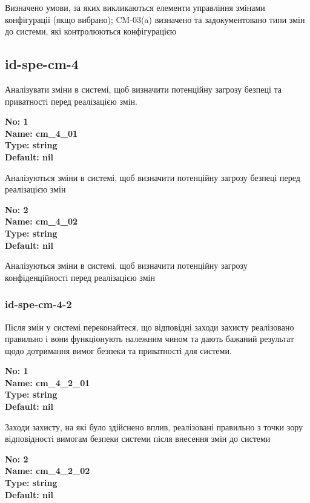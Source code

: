 \documentclass{article}
\begin{document}
{\footnotesize Визначено умови, за яких викликаються елементи управління змінами конфігурації (якщо вибрано); CM-03(a) визначено та задокументовано типи змін до системи, які контролюються конфігурацією}




\subsection{id-spe-cm-4}
Аналізувати зміни в системі, щоб визначити потенційну загрозу безпеці та приватності перед реалізацією змін.

\vspace{10pt}
{\footnotesize\bfseries
No: 1\\
Name: cm\_\allowbreak{}4\_\allowbreak{}01\\
Type: string\\
Default: nil
}

{\footnotesize Аналізуються зміни в системі, щоб визначити потенційну загрозу безпеці перед реалізацією змін}


{\footnotesize\bfseries
No: 2\\
Name: cm\_\allowbreak{}4\_\allowbreak{}02\\
Type: string\\
Default: nil
}

{\footnotesize Аналізуються зміни в системі, щоб визначити потенційну загрозу конфіденційності перед реалізацією змін}




\subsubsection{id-spe-cm-4-2}
Після змін у системі переконайтеся, що відповідні заходи захисту реалізовано правильно і вони функціонують належним чином та дають бажаний результат щодо дотримання вимог безпеки та приватності для системи.

\vspace{10pt}
{\footnotesize\bfseries
No: 1\\
Name: cm\_\allowbreak{}4\_\allowbreak{}2\_\allowbreak{}01\\
Type: string\\
Default: nil
}

{\footnotesize Заходи захисту, на які було здійснено вплив, реалізовані правильно з точки зору відповідності вимогам безпеки системи після внесення змін до системи}


{\footnotesize\bfseries
No: 2\\
Name: cm\_\allowbreak{}4\_\allowbreak{}2\_\allowbreak{}02\\
Type: string\\
Default: nil
}
\end{document}

